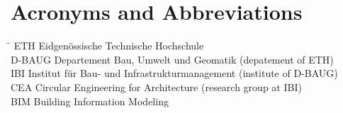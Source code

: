 \chapter*{Acronyms and Abbreviations}
\label{sec:Acronyms and Abbreviations}

\begin{tabbing}
 \hspace*{1.6cm}  \= \kill
 ETH \> Eidgenössische Technische Hochschule \\[0.5ex]
 D-BAUG \> Departement Bau, Umwelt und Geomatik (depatement of ETH) \\[0.5ex]
 IBI \> Institut für Bau- und Infrastrukturmanagement (institute of D-BAUG) \\[0.5ex]
 CEA \> Circular Engineering for Architecture (research group at IBI) \\[0.5ex]


 BIM \> Building Information Modeling \\[0.5ex]
\end{tabbing}